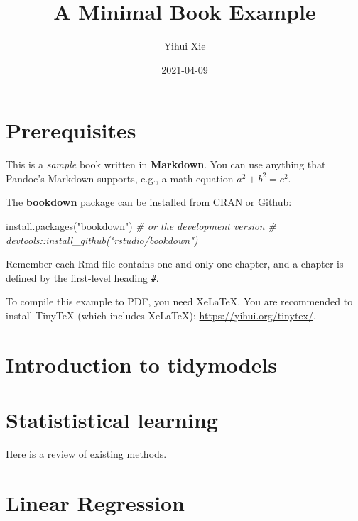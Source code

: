 \documentclass[
]{book}
\title{A Minimal Book Example}
\author{Yihui Xie}
\date{2021-04-09}
\newenvironment{Shaded}{\begin{snugshade}}{\end{snugshade}}
\newcommand{\CommentTok}[1]{\textcolor[rgb]{0.56,0.35,0.01}{\textit{#1}}}
\newcommand{\FunctionTok}[1]{\textcolor[rgb]{0.00,0.00,0.00}{#1}}
\newcommand{\NormalTok}[1]{#1}
\newcommand{\StringTok}[1]{\textcolor[rgb]{0.31,0.60,0.02}{#1}}
\begin{document}
\maketitle

{
\setcounter{tocdepth}{1}
\tableofcontents
}
\hypertarget{prerequisites}{%
\chapter{Prerequisites}\label{prerequisites}}

This is a \emph{sample} book written in \textbf{Markdown}. You can use anything that Pandoc's Markdown supports, e.g., a math equation \(a^2 + b^2 = c^2\).

The \textbf{bookdown} package can be installed from CRAN or Github:

\begin{Shaded}
\begin{Highlighting}[]
\FunctionTok{install.packages}\NormalTok{(}\StringTok{"bookdown"}\NormalTok{)}
\CommentTok{\# or the development version}
\CommentTok{\# devtools::install\_github("rstudio/bookdown")}
\end{Highlighting}
\end{Shaded}

Remember each Rmd file contains one and only one chapter, and a chapter is defined by the first-level heading \texttt{\#}.

To compile this example to PDF, you need XeLaTeX. You are recommended to install TinyTeX (which includes XeLaTeX): \url{https://yihui.org/tinytex/}.

\hypertarget{introduction-to-tidymodels}{%
\chapter{Introduction to tidymodels}\label{introduction-to-tidymodels}}

\hypertarget{statististical-learning}{%
\chapter{Statististical learning}\label{statististical-learning}}

Here is a review of existing methods.

\hypertarget{linear-regression}{%
\chapter{Linear Regression}\label{linear-regression}}
\end{document}
